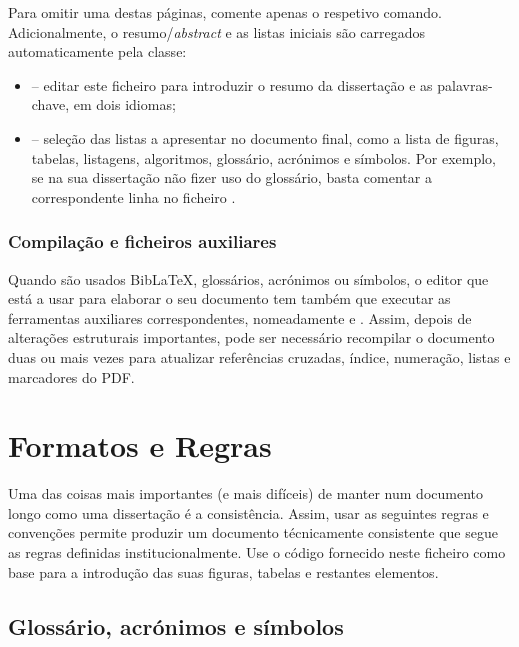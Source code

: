 Para omitir uma destas páginas, comente apenas o respetivo comando. Adicionalmente, o resumo/\textit{abstract} e as listas iniciais são carregados automaticamente pela classe:
\begin{itemize}
    \item {} -- editar este ficheiro para introduzir o resumo da dissertação e as palavras-chave, em dois idiomas;
    \item {} -- seleção das listas a apresentar no documento final, como a lista de figuras, tabelas, listagens, algoritmos, glossário, acrónimos e símbolos. Por exemplo, se na sua dissertação não fizer uso do glossário, basta comentar a correspondente linha no ficheiro .
\end{itemize}

 
\subsubsection*{Compilação e ficheiros auxiliares}

Quando são usados Bib\LaTeX{}, glossários, acrónimos ou símbolos, o editor que está a usar para elaborar o seu documento tem também que executar as ferramentas auxiliares correspondentes, nomeadamente
 e . Assim, depois de alterações estruturais importantes, pode ser necessário recompilar o documento duas ou mais vezes para atualizar referências cruzadas, índice, numeração, listas e marcadores do PDF. 


\section{Formatos e Regras}
\label{sec:Ch2.3}

Uma das coisas mais importantes (e mais difíceis) de manter num documento longo como uma dissertação é a consistência. Assim, usar as seguintes regras e convenções permite produzir um documento técnicamente consistente que segue as regras definidas institucionalmente. Use o código fornecido neste ficheiro como base para a introdução das suas figuras, tabelas e restantes elementos. 


\subsection{Glossário, acrónimos e símbolos}

